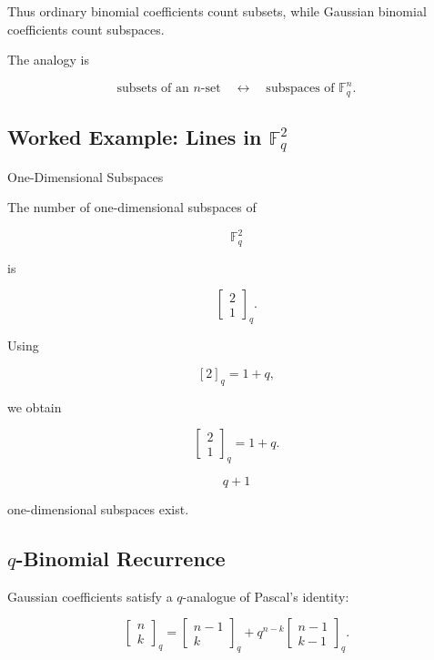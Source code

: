 Thus ordinary binomial coefficients count subsets, while Gaussian
binomial coefficients count subspaces.

The analogy is

\[
\boxed{
\text{subsets of an }n\text{-set}
\quad\leftrightarrow\quad
\text{subspaces of }\mathbb{F}_q^n.
}
\]

\subsection{Worked Example: Lines in \(\mathbb{F}_q^2\)}
\label{subsec:worked-gaussian-lines}

\begin{workedexamplebox}{One-Dimensional Subspaces}

The number of one-dimensional subspaces of

\[
\mathbb{F}_q^2
\]

is

\[
\begin{bmatrix}
2\\
1
\end{bmatrix}_q.
\]

Using

\[
[2]_q=1+q,
\]

we obtain

\[
\begin{bmatrix}
2\\
1
\end{bmatrix}_q
=
1+q.
\]

\begin{answerbox}
\[
\boxed{
q+1
}
\]

one-dimensional subspaces exist.
\end{answerbox}

\end{workedexamplebox}

\subsection{\(q\)-Binomial Recurrence}
\label{subsec:q-binomial-recurrence}

Gaussian coefficients satisfy a \(q\)-analogue of Pascal's identity:

\[
\boxed{
\begin{bmatrix}
n\\
k
\end{bmatrix}_q
=
\begin{bmatrix}
n-1\\
k
\end{bmatrix}_q
+
q^{n-k}
\begin{bmatrix}
n-1\\
k-1
\end{bmatrix}_q.
}
\]

